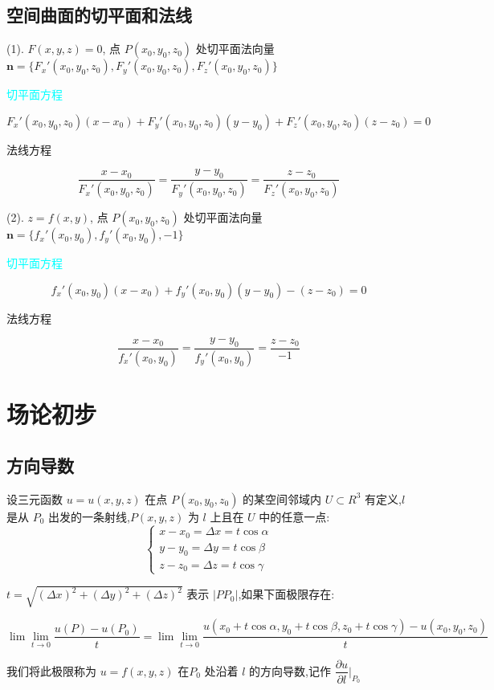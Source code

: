 \subsection{空间曲面的切平面和法线}
\begin{definition}
	
	(1). $F(x,y,z)=0$, 点 $P(x_{0},y_{0},z_{0})$ 处切平面法向量 $\boldsymbol{n} = \{F_{x}'(x_{0},y_{0},z_{0}),F_{y}'(x_{0},y_{0},z_{0}),F_{z}'(x_{0},y_{0},z_{0})\}$
	
	\textcolor{cyan}{切平面方程}
	
	$$F_{x}'(x_{0},y_{0},z_{0})(x-x_{0}) + F_{y}'(x_{0},y_{0},z_{0})(y-y_{0}) + F_{z}'(x_{0},y_{0},z_{0})(z-z_{0}) = 0$$

	\textcolor{purplea}{法线方程}
	
	$$\dfrac{x-x_{0}}{F_{x}'(x_{0},y_{0},z_{0})} = \dfrac{y-y_{0}}{F_{y}'(x_{0},y_{0},z_{0})}=\dfrac{z-z_{0}}{F_{z}'(x_{0},y_{0},z_{0})}$$
	
	(2). $z=f(x,y)$, 点 $P(x_{0},y_{0},z_{0})$ 处切平面法向量 $\boldsymbol{n} = \{f_{x}'(x_{0},y_{0}),f_{y}'(x_{0},y_{0}),-1\}$
	
	
	\textcolor{cyan}{切平面方程}

	$$f_{x}'(x_{0},y_{0})(x-x_{0}) + f_{y}'(x_{0},y_{0})(y-y_{0}) - (z-z_{0}) = 0$$
	
	\textcolor{purplea}{法线方程}
	
	$$\dfrac{x-x_{0}}{f_{x}'(x_{0},y_{0})} = \dfrac{y-y_{0}}{f_{y}'(x_{0},y_{0})} = \dfrac{z-z_{0}}{-1}$$
\end{definition}

\section{场论初步}

\subsection{方向导数}
\begin{definition}[方向导数]
	
	设三元函数 $u=u(x,y,z)$ 在点 $P(x_{0},y_{0},z_{0})$ 的某空间邻域内 $U\subset R^3$ 有定义,$l$ 是从 $P_{0}$ 出发的一条射线,$P(x,y,z)$ 为 $l$ 上且在 $U$ 中的任意一点: 
	$$\begin{cases}
		x-x_{0}=\Delta x=t\cos \alpha\\
		y-y_{0}=\Delta y=t\cos \beta\\
		z-z_{0}=\Delta z=t\cos \gamma
	\end{cases}$$ 
	
	$t=\sqrt{(\Delta x)^2+(\Delta y)^2+(\Delta z)^2}$ 表示 $|PP_{0}|$,如果下面极限存在: 

	$$\lim\lim\limits_{t\rightarrow 0}\frac{u(P)-u(P_{0})}{t}=\lim\lim\limits_{t\rightarrow 0}\frac{u(x_{0}+t\cos \alpha,y_{0}+t\cos \beta,z_{0}+t\cos \gamma)-u(x_{0},y_{0},z_{0})}{t}$$
	
	我们将此极限称为 $u=f(x,y,z)$ 在$P_{0}$ 处沿着 $l$ 的方向导数,记作 $\dfrac{\partial u}{\partial l}|_{P_{0}}$
\end{definition}

